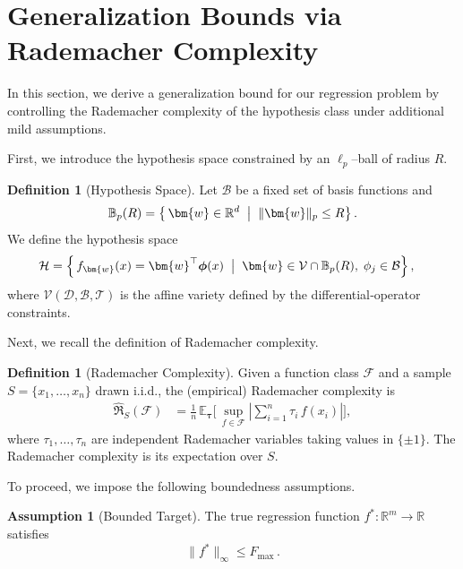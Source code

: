 \documentclass{article}
\theoremstyle{plain}
\theoremstyle{definition}
\newtheorem{definition}[theorem]{Definition}
\newtheorem{assumption}[theorem]{Assumption}
\theoremstyle{remark}
\begin{document}
\section{Generalization Bounds via Rademacher Complexity}
\label{app:Rademacher}
In this section, we derive a generalization bound for our regression problem by controlling the Rademacher complexity of the hypothesis class under additional mild assumptions.

First, we introduce the hypothesis space constrained by an $\ell_{p}$–ball of radius $R$.

\begin{definition}[Hypothesis Space]
  Let $\mathcal{B}$ be a fixed set of basis functions and
  $$\mathbb{B}_{p}(R) = \left\{\,\bm{w}\in\mathbb{R}^{d}\;\bigm|\;\|\bm{w}\|_{p}\le R\right\}.$$ 
  We define the hypothesis space
  \begin{align*}
    \mathcal{H}
    &= \left\{\,f_{\bm{w}}(x) = \bm{w}^{\top}\boldsymbol{\phi}(x)
       \;\bigm|\;\bm{w}\in\mathcal{V}\cap\mathbb{B}_{p}(R),\;
           \phi_{j}\in\mathcal{B}\right\},
  \end{align*}
  where $\mathcal{V}(\mathscr{D},\mathcal{B},\mathcal{T})$ is the affine variety defined by the differential‐operator constraints.
\end{definition}

Next, we recall the definition of Rademacher complexity.

\begin{definition}[Rademacher Complexity]
  Given a function class $\mathcal{F}$ and a sample
  $S = \{x_{1},\dots,x_{n}\}$ drawn i.i.d., the (empirical) Rademacher complexity is
  \begin{align*}
    \widehat{\mathfrak{R}}_{S}(\mathcal{F})
    &= \frac{1}{n}\,\mathbb{E}_{\boldsymbol{\tau}}\Biggl[\,
       \sup_{f\in\mathcal{F}}
       \left|\sum_{i=1}^{n}\tau_{i}\,f(x_{i})\right|\Biggr],
  \end{align*}
  where $\tau_{1},\dots,\tau_{n}$ are independent Rademacher variables taking values in $\{\pm1\}$.  The Rademacher complexity is its expectation over $S$.
\end{definition}

To proceed, we impose the following boundedness assumptions.

\begin{assumption}[Bounded Target]\label{assump:bounded_target}
  The true regression function $f^{*}:\mathbb{R}^{m}\to\mathbb{R}$ satisfies
  $$\|f^{*}\|_{\infty}\le F_{\max}\,. $$
\end{assumption}
\end{document}

